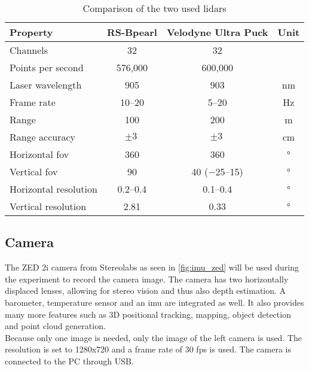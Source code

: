 \begin{table}[ht]
	\centering
	\caption{Comparison of the two used \acrshort{lidar}s \cite{RoboSense2020, Velodyne2018}}
	\label{tab:lidar_datasheets}
	\begin{tabular}[t]{lccc}
		\toprule
		\textbf{Property}     & \textbf{RS-Bpearl}   & \textbf{Velodyne Ultra Puck}    & \textbf{Unit}     \\
		\midrule
		Channels              & 32                   & 32                              &                   \\
		Points per second     & 576,000              & 600,000                         & \si{}             \\
		Laser wavelength      & \SI{905}{}           & \SI{903}{}                      & \si{\nano\metre}  \\
		Frame rate            & \SIrange{10}{20}{}   & \SIrange{5}{20}{}               & \si{\hertz}       \\
		Range                 & \SI{100}{}           & \SI{200}{}                      & \si{\metre}       \\
		Range accuracy        & $\pm\SI{3}{}$        & $\pm\SI{3}{}$                   & \si{\centi\metre} \\
		Horizontal \gls{fov}  & \SI{360}{}           & \SI{360}{}                      & \si{\degree}      \\
		Vertical \gls{fov}    & \SI{90}{}            & \SI{40}{} (\SIrange{-25}{15}{}) & \si{\degree}      \\
		Horizontal resolution & \SIrange{0.2}{0.4}{} & \SIrange{0.1}{0.4}{}            & \si{\degree}      \\
		Vertical resolution   & \SI{2.81}{}          & \SI{0.33}{}                     & \si{\degree}      \\
		\bottomrule
	\end{tabular}
\end{table}


\subsection{Camera}
\label{ssec:camera}
The ZED 2i camera from Stereolabs as seen in \cref{fig:imu_zed} will be used during the experiment to record the camera image.
The camera has two horizontally displaced lenses, allowing for stereo vision and thus also depth estimation.
A barometer, temperature sensor and an \gls{imu} are integrated as well.
It also provides many more features such as 3D positional tracking, mapping, object detection and point cloud generation.\\
Because only one image is needed, only the image of the left camera is used.
The resolution is set to 1280x720 and a frame rate of 30 fps is used.
The camera is connected to the PC through USB.



